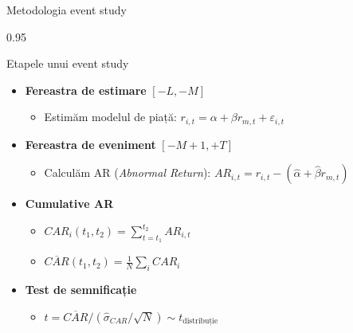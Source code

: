 \documentclass[9pt, aspectratio=169, t]{beamer}
\begin{document}
\begin{frame}[shrink=15]{Metodologia event study}
\begin{cminipage}{0.95\textwidth}
\begin{block}{Etapele unui event study}
\begin{itemize}\setlength{\itemsep}{0pt}
    \item \textbf{Fereastra de estimare} $[-L, -M]$
    \begin{itemize}\setlength{\itemsep}{0pt}
        \item Estimăm modelul de piață: $r_{i,t} = \alpha + \beta r_{m,t} + \varepsilon_{i,t}$
    \end{itemize}
    \item \textbf{Fereastra de eveniment} $[-M+1, +T]$
    \begin{itemize}\setlength{\itemsep}{0pt}
        \item Calculăm AR (\textit{Abnormal Return}): $AR_{i,t} = r_{i,t} - (\hat\alpha + \hat\beta r_{m,t})$
    \end{itemize}
    \item \textbf{Cumulative AR}
    \begin{itemize}\setlength{\itemsep}{0pt}
        \item $CAR_i(t_1, t_2) = \sum_{t=t_1}^{t_2} AR_{i,t}$
        \item $\overline{CAR}(t_1, t_2) = \frac{1}{N}\sum_i CAR_i$
    \end{itemize}
    \item \textbf{Test de semnificație}
    \begin{itemize}\setlength{\itemsep}{0pt}
        \item $t = \overline{CAR}/(\hat\sigma_{CAR}/\sqrt{N}) \sim t_{\text{distribuție}}$
    \end{itemize}
\end{itemize}
\end{block}
\end{cminipage}
\end{frame}
\end{document}

